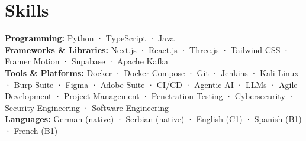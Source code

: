 \section*{Skills}
\textbf{Programming:} Python · TypeScript · Java \\
\textbf{Frameworks \& Libraries:} Next.js · React.js · Three.js · Tailwind CSS · Framer Motion · Supabase · Apache Kafka \\
\textbf{Tools \& Platforms:} Docker · Docker Compose · Git · Jenkins · Kali Linux · Burp Suite · Figma · Adobe Suite · CI/CD · Agentic AI · LLMs · Agile Development · Project Management · Penetration Testing · Cybersecurity · Security Engineering · Software Engineering \\
\textbf{Languages:} German (native) · Serbian (native) · English (C1) · Spanish (B1) · French (B1)